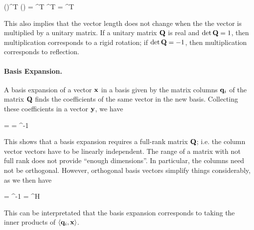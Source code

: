\bee
(\Qbf \xbf)^T (\Qbf \xbf) = \xbf^T \Qbf^T \Qbf \xbf = \xbf^T \xbf
\eee

This also implies that the vector length does not change when the the vector is multiplied by a unitary matrix. If a unitary matrix $\mathbf{Q}$ is real and $\det \mathbf{Q} = 1$, then multiplication corresponds to a rigid rotation; if $\det \mathbf{Q} = -1$, then multiplication corresponds to reflection.

\paragraph{Basis Expansion.} A basis expansion of a vector $\mathbf{x}$ in a basis given by the matrix columns $\mathbf{q}_i$ of the matrix $\mathbf{Q}$ finds the coefficients of the same vector in the new basis. Collecting these coefficients in a vector $\mathbf{y}$, we have

\bee
\Qbf \ybf = \xbf \rightarrow \ybf = \Qbf^{-1} \xbf
\eee

This shows that a basis expansion requires a full-rank matrix $\mathbf{Q}$; i.e. the column vector vectors have to be linearly independent. The range of a matrix with not full rank does not provide ``enough dimensions''. In particular, the columns need not be orthogonal. However, orthogonal basis vectors simplify things considerably, as we then have

\bee
\ybf = \Qbf^{-1} \xbf = \Qbf^H \xbf
\eee

This can be interpretated that the basis expansion corresponds to taking the inner products of $\langle \mathbf{q}_i, \mathbf{x} \rangle$.



